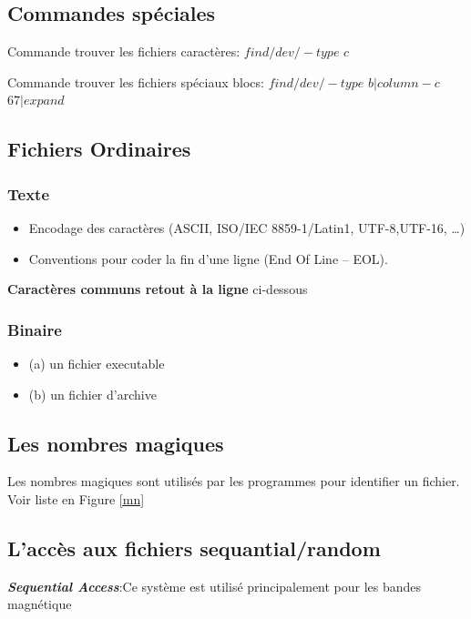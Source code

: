 \subsection{Commandes spéciales}
Commande trouver les fichiers caractères: $find / dev / - type$ $c$

Commande trouver les fichiers spéciaux blocs:  $find / dev / - type$ $b | column -c$ $67 | expand$

\subsection{Fichiers Ordinaires}
\subsubsection{Texte}
\begin{itemize}
    \item Encodage des caractères (ASCII, ISO/IEC 8859-1/Latin1, UTF-8,UTF-16, …)
    \item Conventions pour coder la fin d’une ligne (End Of Line – EOL).
\end{itemize}

\textbf{Caractères communs retout à la ligne} ci-dessous

\subsubsection{Binaire}

\begin{itemize}
    \item (a) un fichier executable
    \item (b) un fichier d'archive
\end{itemize}

\subsection{Les nombres magiques}
Les nombres magiques sont utilisés par les programmes pour identifier un fichier. Voir liste en Figure \ref{mn}


\subsection{L'accès aux fichiers sequantial/random}
\textbf{\textit{Sequential Access}}:Ce système est utilisé principalement pour les bandes magnétique

